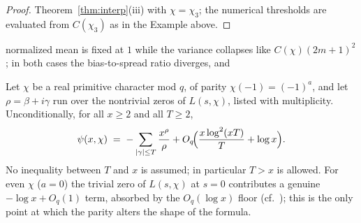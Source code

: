 \begin{proof}
Theorem~\ref{thm:interp}(iii) with $\chi=\chi_3$; the numerical
thresholds are evaluated from $C(\chi_3)$ as in the Example above.
\end{proof}

normalized mean is fixed at $1$ while the variance collapses like
$C(\chi)(2m+1)^2$; in both cases the bias-to-spread ratio diverges, and

\begin{lemma}\label{lem:classical}
Let $\chi$ be a real primitive character mod $q$, of parity
$\chi(-1)=(-1)^a$, and let $\rho=\beta+i\gamma$ run over the nontrivial
zeros of $L(s,\chi)$, listed with multiplicity. Unconditionally, for all
$x\ge2$ and all $T\ge2$,
\begin{equation}\label{eq:classical}
\psi(x,\chi)\;=\;-\sum_{|\gamma|\le T}\frac{x^{\rho}}{\rho}
+O_q\!\Bigl(\frac{x\log^2(xT)}{T}+\log x\Bigr).
\end{equation}
No inequality between $T$ and $x$ is assumed; in particular $T>x$ is
allowed. For even $\chi$ ($a=0$) the trivial zero of $L(s,\chi)$ at
$s=0$ contributes a genuine $-\log x+O_q(1)$ term, absorbed by the
$O_q(\log x)$ floor (cf.\ \cite[Ch.~19]{Dav00}); this is the only
point at which the parity alters the shape of the formula.
\end{lemma}

